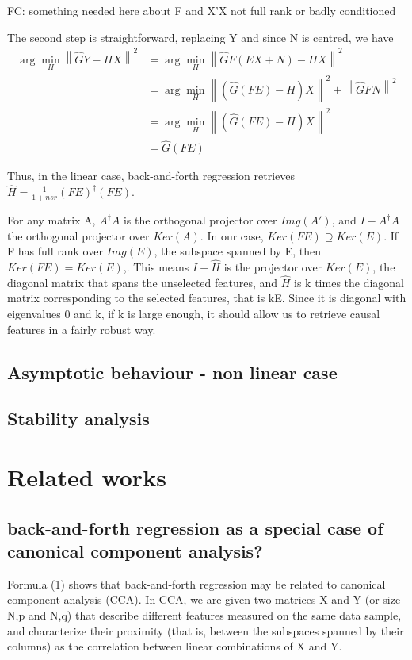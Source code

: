 \documentclass{article}
\begin{document}
FC: something needed here about F and X'X not full rank or badly conditioned

The second step is straightforward, replacing Y and since N is centred, we have
\begin{equation}
\begin{aligned}
\arg \min_H \left \| \hat GY - HX \right \|^2 &=\arg  \min_H \left \| \hat GF(EX+N) - HX \right \|^2 \\
&=\arg \min_H \left \| (\hat G(FE)-H)X \right \| ^2 + \left \| \hat GFN \right \| ^2\\
&= \arg \min_H \left \| (\hat G(FE)-H)X \right \| ^2\\
&=\hat G (FE)
\end{aligned}
\end{equation}

Thus, in the linear case, back-and-forth regression retrieves $\hat H = \frac{1}{1+nsr}(FE)^{\dagger}(FE)$.

For any matrix A, $A^\dagger A$ is the orthogonal projector over $Img(A')$, and $I-A^\dagger A$ the orthogonal projector over $Ker(A)$.
%
In our case, $Ker(FE)\supseteq Ker(E)$.
%
If F has full rank over $Img(E)$, the subspace spanned by E, then $Ker(FE) = Ker(E)$,.
%
This means $I - \hat H$ is the projector over $Ker(E)$, the diagonal matrix that spans the unselected features, and $\hat H$ is k times the diagonal matrix corresponding to the selected features, that is kE. Since it is diagonal with eigenvalues 0 and k, if k is large enough, it should allow us to retrieve causal features in a fairly robust way.

\subsection{Asymptotic behaviour - non linear case}

\subsection{Stability analysis}


\section{Related works}
\subsection{back-and-forth regression as a special case of canonical component analysis?}
Formula (1) shows that back-and-forth regression may be related to canonical component analysis (CCA).
%
In CCA, we are given two matrices X and Y (or size N,p and N,q) that describe different features measured on the same data sample, and characterize their proximity (that is, between the subspaces spanned by their columns) as the correlation between linear combinations of X and Y.
\end{document}
